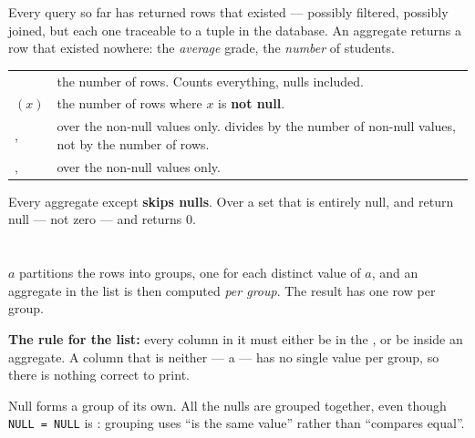 Every query so far has returned rows that existed --- possibly filtered,
possibly joined, but each one traceable to a tuple in the database. An
aggregate returns a row that existed nowhere: the \emph{average} grade, the
\emph{number} of students.

\begin{definitionbox}
\begin{tabular}{@{}L{3.6cm}L{10.4cm}@{}}
 & the number of rows. Counts everything, nulls included. \\
$(x)$ & the number of rows where $x$ is \textbf{not null}. \\
,  & over the non-null values only. 
  divides by the number of non-null values, not by the number of rows. \\
,  & over the non-null values only. \\
\end{tabular}

\smallskip
Every aggregate except  \textbf{skips nulls}. Over a set that
is entirely null,  and  return null --- not zero ---
and  returns 0.
\end{definitionbox}

\section{}

\begin{definitionbox}[Grouping]
 $a$ partitions the rows into groups, one for each distinct
value of $a$, and an aggregate in the  list is then computed
\emph{per group}. The result has one row per group.

\smallskip
\textbf{The rule for the  list:} every column in it must either
be in the , or be inside an aggregate. A column that is neither
--- a  --- has no single value per group, so there is
nothing correct to print.

\smallskip
Null forms a group of its own. All the nulls are grouped together, even though
\texttt{NULL = NULL} is \unk{}: grouping uses ``is the same value''
rather than ``compares equal''.
\end{definitionbox}


